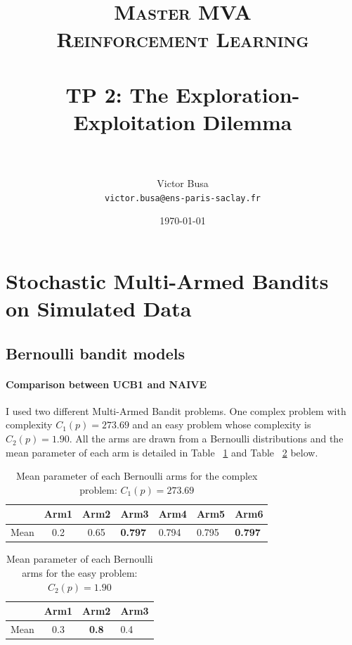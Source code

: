 \documentclass[11pt]{article}
\title{	
\normalfont \normalsize 
\textsc{Master MVA \\
Reinforcement Learning} \\ [20pt]
\horrule{0.5pt} \\[0.2cm] %
\textbf{TP 2}: The Exploration-Exploitation Dilemma \\
\horrule{2pt} \\[0.3cm] %
}
\author{Victor Busa \\
   \texttt{victor.busa@ens-paris-saclay.fr}}
\date{\normalsize\today}
\numberwithin{figure}{section} %
\begin{document}
\maketitle

\section{Stochastic Multi-Armed Bandits on Simulated Data}
\subsection{Bernoulli bandit models}
\paragraph{Comparison between UCB1 and NAIVE}

I used two different Multi-Armed Bandit problems. One complex problem with complexity $C_1(p) = 273.69$ and an easy problem whose complexity is $C_2(p) = 1.90$. All the arms are drawn from a Bernoulli distributions and the mean parameter of each arm is detailed in Table ~\ref{table:complex_ber} and Table ~\ref{table:easy_ber} below.

\begin{table}[h]
\centering
\begin{tabular}{|c|c|c|l|l|l|l|}
\hline
 & \textbf{Arm1} & \textbf{Arm2} & \textbf{Arm3} & \textbf{Arm4} & \textbf{Arm5} & \textbf{Arm6} \\ \hline
Mean & 0.2 & 0.65 & \textbf{0.797} & 0.794 & 0.795 & \textbf{0.797} \\ \hline
\end{tabular}
\caption{Mean parameter of each Bernoulli arms for the complex problem: $C_1(p) = 273.69$}
\label{table:complex_ber}
\end{table}

\begin{table}[h]
\centering
\begin{tabular}{|c|c|c|l|}
\hline
 & \textbf{Arm1} & \textbf{Arm2} & \textbf{Arm3} \\ \hline
Mean & 0.3 & \textbf{0.8} & 0.4 \\ \hline
\end{tabular}
\caption{Mean parameter of each Bernoulli arms for the easy problem: $C_2(p) = 1.90$}
\label{table:easy_ber}
\end{table}
\end{document}

